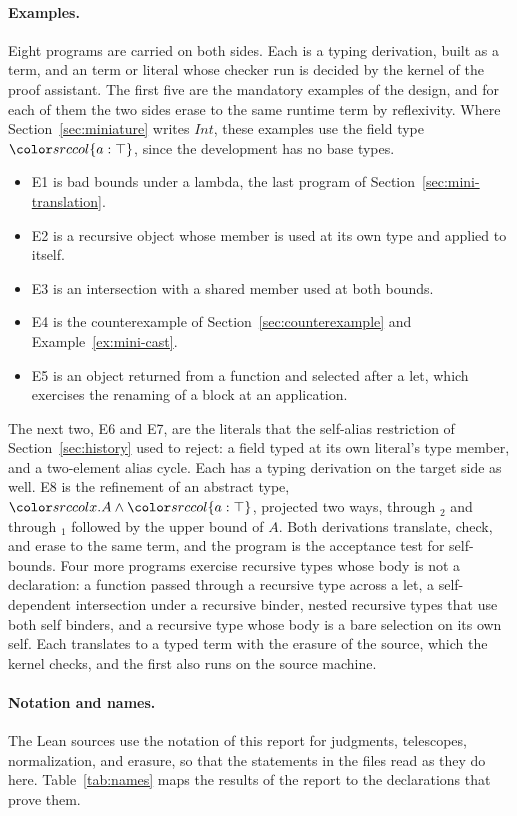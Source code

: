 \paragraph{Examples.}
Eight programs are carried on both sides. Each is a \DOTMNF typing derivation, built as a term, and an \FCdot term or literal whose checker run is decided by the kernel of the proof assistant. The first five are the mandatory examples of the design, and for each of them the two sides erase to the same runtime term by reflexivity. Where Section~\ref{sec:miniature} writes $\mathit{Int}$, these examples use the field type $\dfld{a}{\top}$, since the development has no base types.
\begin{itemize}
\item E1 is bad bounds under a lambda, the last program of Section~\ref{sec:mini-translation}.
\item E2 is a recursive object whose member is used at its own type and applied to itself.
\item E3 is an intersection with a shared member used at both bounds.
\item E4 is the counterexample of Section~\ref{sec:counterexample} and Example~\ref{ex:mini-cast}.
\item E5 is an object returned from a function and selected after a let, which exercises the renaming of a block at an application.
\end{itemize}
The next two, E6 and E7, are the literals that the self-alias restriction of Section~\ref{sec:history} used to reject: a field typed at its own literal's type member, and a two-element alias cycle. Each has a typing derivation on the target side as well. E8 is the refinement of an abstract type, $\dsel{x}{A} \wedge \dfld{a}{\top}$, projected two ways, through $_2$ and through $_1$ followed by the upper bound of $A$. Both derivations translate, check, and erase to the same term, and the program is the acceptance test for self-bounds. Four more programs exercise recursive types whose body is not a declaration: a function passed through a recursive type across a let, a self-dependent intersection under a recursive binder, nested recursive types that use both self binders, and a recursive type whose body is a bare selection on its own self. Each translates to a typed term with the erasure of the source, which the kernel checks, and the first also runs on the source machine.

\paragraph{Notation and names.}
The Lean sources use the notation of this report for judgments, telescopes, normalization, and erasure, so that the statements in the files read as they do here. Table~\ref{tab:names} maps the results of the report to the declarations that prove them.

